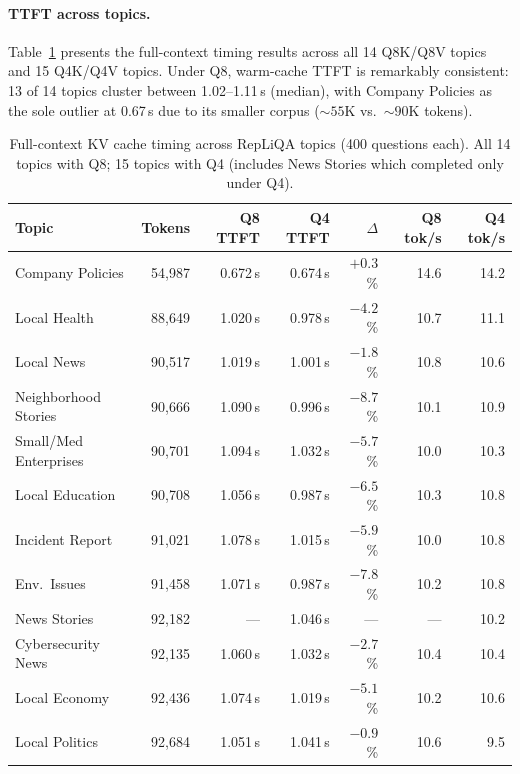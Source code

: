 \documentclass{article}
\begin{document}
\paragraph{TTFT across topics.}
Table~\ref{tab:repliqa_ttft} presents the full-context timing results
across all 14 Q8K/Q8V topics and 15 Q4K/Q4V topics. Under Q8, warm-cache TTFT is
remarkably consistent: 13 of 14 topics cluster between 1.02--1.11\,s
(median), with Company Policies as the sole outlier at 0.67\,s due to its
smaller corpus (${\sim}55$K vs.\ ${\sim}90$K tokens).

\begin{table}[t]
\centering
\caption{Full-context KV cache timing across RepLiQA topics
(400 questions each). All 14 topics with Q8; 15 topics with Q4
(includes News Stories which completed only under Q4).}
\label{tab:repliqa_ttft}
\small
\begin{tabular}{lrrrrrr}
\toprule
\textbf{Topic} & \textbf{Tokens} & \textbf{Q8 TTFT} & \textbf{Q4 TTFT} &
\textbf{$\Delta$} & \textbf{Q8 tok/s} & \textbf{Q4 tok/s} \\
\midrule
Company Policies        & 54,987  & 0.672\,s & 0.674\,s & $+0.3$\% & 14.6 & 14.2 \\
Local Health            & 88,649  & 1.020\,s & 0.978\,s & $-4.2$\% & 10.7 & 11.1 \\
Local News              & 90,517  & 1.019\,s & 1.001\,s & $-1.8$\% & 10.8 & 10.6 \\
Neighborhood Stories    & 90,666  & 1.090\,s & 0.996\,s & $-8.7$\% & 10.1 & 10.9 \\
Small/Med Enterprises   & 90,701  & 1.094\,s & 1.032\,s & $-5.7$\% & 10.0 & 10.3 \\
Local Education         & 90,708  & 1.056\,s & 0.987\,s & $-6.5$\% & 10.3 & 10.8 \\
Incident Report         & 91,021  & 1.078\,s & 1.015\,s & $-5.9$\% & 10.0 & 10.8 \\
Env.\ Issues            & 91,458  & 1.071\,s & 0.987\,s & $-7.8$\% & 10.2 & 10.8 \\
News Stories            & 92,182  & ---      & 1.046\,s & ---       & ---  & 10.2 \\
Cybersecurity News      & 92,135  & 1.060\,s & 1.032\,s & $-2.7$\% & 10.4 & 10.4 \\
Local Economy           & 92,436  & 1.074\,s & 1.019\,s & $-5.1$\% & 10.2 & 10.6 \\
Local Politics          & 92,684  & 1.051\,s & 1.041\,s & $-0.9$\% & 10.6 & 9.5 \\

\end{tabular}
\end{table}
\end{document}
